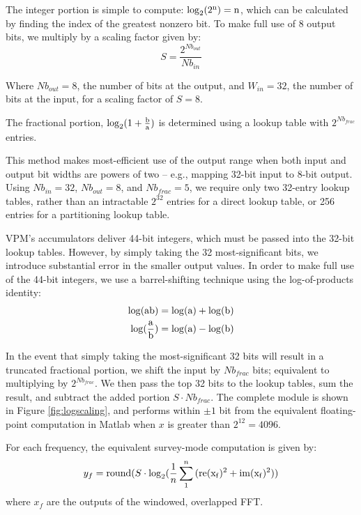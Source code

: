 The integer portion is simple to compute: $\rm{log}_2({2^{n}}) = n$, which can be calculated by finding the index of the greatest nonzero bit. To make full use of 8 output bits, we multiply by a scaling factor given by:
\begin{equation}
S = \frac{2^{Nb_{out}}}{Nb_{in}}
\end{equation}

Where $Nb_{out} = 8$, the number of bits at the output, and $W_{in} = 32$, the number of bits at the input, for a scaling factor of $S = 8$.

The fractional portion, $\rm{log}_2(1 + \frac{b}{a})$ is determined using a lookup table with $2^{Nb_{frac}}$ entries.

This method makes most-efficient use of the output range when both input and output bit widths are powers of two -- e.g., mapping 32-bit input to 8-bit output. Using $Nb_{in} = 32$, $Nb_{out} = 8$, and $Nb_{frac} = 5$, we require only two 32-entry lookup tables, rather than an intractable $2^{32}$ entries for a direct lookup table, or 256 entries for a partitioning lookup table.

VPM's accumulators deliver 44-bit integers, which must be passed into the 32-bit lookup tables. However, by simply taking the 32 most-significant bits, we introduce substantial error in the smaller output values. In order to make full use of the 44-bit integers, we use a barrel-shifting technique using the log-of-products identity:
\begin{eqnarray}
\rm{log}(ab) = \rm{log}(a) + \rm{log}(b) \\
\rm{log}(\frac{a}{b}) = \rm{log}(a) - \rm{log}(b) 
\end{eqnarray}

In the event that simply taking the most-significant 32 bits will result in a truncated fractional portion, we shift the input by $Nb_{frac}$ bits; equivalent to multiplying by $2^{Nb_{frac}}$. We then pass the top 32 bits to the lookup tables, sum the result, and subtract the added portion $S\cdot Nb_{frac}$. The complete module is shown in Figure \ref{fig:logscaling}, and performs within $\pm 1$ bit from the equivalent floating-point computation in Matlab when $x$ is greater than $2^{12} = 4096$.



For each frequency, the equivalent survey-mode computation is given by:
\begin{equation}
y_f = {\rm round}(S \cdot {\rm log}_2(\frac{1}{n}\sum_1^n{(\rm{re}(x_f)^2 + \rm{im}(x_f)^2)})
\end{equation}
where $x_f$ are the outputs of the windowed, overlapped FFT.


